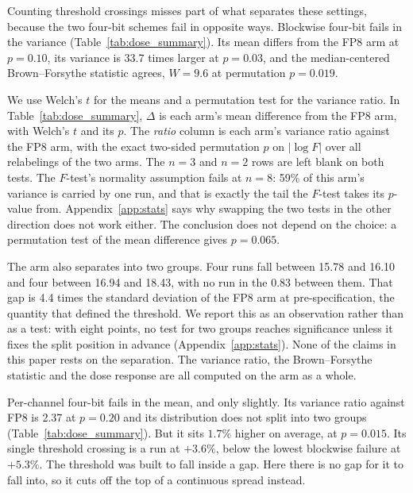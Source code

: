 \documentclass[11pt,letterpaper]{article}
\begin{document}
Counting threshold crossings misses part of what separates these settings, because the two four-bit schemes fail in opposite ways. Blockwise four-bit fails in the variance (Table~\ref{tab:dose_summary}). Its mean differs from the FP8 arm at $p = 0.10$, its variance is 33.7 times larger at $p = 0.03$, and the median-centered Brown--Forsythe statistic agrees, $W = 9.6$ at permutation $p = 0.019$.

We use Welch's $t$ for the means and a permutation test for the variance ratio. In Table~\ref{tab:dose_summary}, $\Delta$ is each arm's mean difference from the FP8 arm, with Welch's $t$ and its $p$. The \emph{ratio} column is each arm's variance ratio against the FP8 arm, with the exact two-sided permutation $p$ on $|\log F|$ over all relabelings of the two arms. The $n{=}3$ and $n{=}2$ rows are left blank on both tests. The $F$-test's normality assumption fails at $n = 8$: 59\% of this arm's variance is carried by one run, and that is exactly the tail the $F$-test takes its $p$-value from. Appendix~\ref{app:stats} says why swapping the two tests in the other direction does not work either. The conclusion does not depend on the choice: a permutation test of the mean difference gives $p = 0.065$.

The arm also separates into two groups. Four runs fall between 15.78 and 16.10 and four between 16.94 and 18.43, with no run in the 0.83 between them. That gap is 4.4 times the standard deviation of the FP8 arm at pre-specification, the quantity that defined the threshold. We report this as an observation rather than as a test: with eight points, no test for two groups reaches significance unless it fixes the split position in advance (Appendix~\ref{app:stats}). None of the claims in this paper rests on the separation. The variance ratio, the Brown--Forsythe statistic and the dose response are all computed on the arm as a whole.

Per-channel four-bit fails in the mean, and only slightly. Its variance ratio against FP8 is 2.37 at $p = 0.20$ and its distribution does not split into two groups (Table~\ref{tab:dose_summary}). But it sits $1.7\%$ higher on average, at $p = 0.015$. Its single threshold crossing is a run at $+3.6\%$, below the lowest blockwise failure at $+5.3\%$. The threshold was built to fall inside a gap. Here there is no gap for it to fall into, so it cuts off the top of a continuous spread instead.
\end{document}
